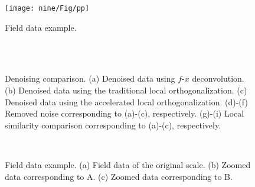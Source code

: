 \begin{figure}[htb!]
\centering
\texttt{[image: nine/Fig/pp]}
\caption{Field data example.}
\label{fig:pp}
\end{figure}



\begin{figure}[htb!]
\centering
{}
\\
   \\  
\caption{Denoising comparison. (a) Denoised data using $f$-$x$ deconvolution. (b) Denoised data using the traditional local orthogonalization. (c) Denoised data using the accelerated local orthogonalization. (d)-(f) Removed noise corresponding to (a)-(c), respectively. (g)-(i) Local similarity comparison corresponding to (a)-(c), respectively.}
\label{fig:pp-fx,pp-ortho,pp-ortho2,ppdiff-fx0,ppdiff-ortho0,ppdiff-ortho20,pp-simi,pp-simi-ortho,pp-simi-ortho2}
\end{figure}


%


\begin{figure}[htb!]
\centering
{}\\
\caption{Field data example. (a) Field data of the original scale. (b) Zoomed data corresponding to A. (c) Zoomed data corresponding to B.}
\label{fig:data0,zoom-data-a,zoom-data-b}
\end{figure}


